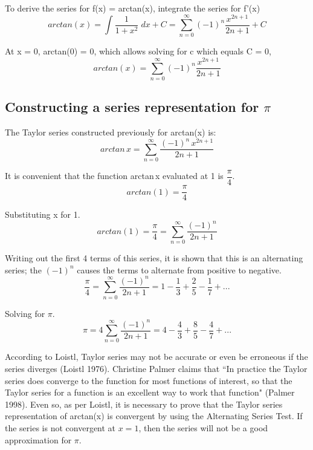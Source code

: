 \documentclass[12pt, titlepage]{article}
\begin{document}
To derive the series for f(x) = arctan(x), integrate the series for f'(x)
\begin{equation*}
    arctan(x) = \int \frac{1}{1+x^{2}} \; dx + C = \sum_{n=0}^{\infty} (-1)^{n}\frac{x^{2n+1}}{2n+1} + C
\end{equation*}

At x = 0, arctan(0) = 0, which allows solving for c which equals C = 0,
\begin{equation*}
    arctan(x) = \sum_{n=0}^{\infty} (-1)^{n}\frac{x^{2n+1}}{2n+1} 
\end{equation*}

\subsection{Constructing a series representation for \(\pi\)}
The Taylor series constructed previously for arctan(x) is:
\begin{equation*}
    arctan\,x = \sum^{\infty}_{n=0} \frac{(-1)^{n}\,x^{2n+1}}{2n+1}
\end{equation*}

It is convenient that the function arctan\,x evaluated at 1 is \(\dfrac{\pi}{4}\).
\begin{equation*}
    arctan(1) = \frac{\pi}{4}
\end{equation*}

Substituting x for 1.
\begin{equation*}
    arctan(1) = \frac{\pi}{4} = \sum_{n=0}^\infty{ \frac{(-1)^n}{2n+1}}
\end{equation*}

Writing out the first 4 terms of this series, it is shown that this is an alternating series; the \((-1)^{n}\) causes the terms to alternate from positive to negative.
\begin{equation*}
    \frac{\pi}{4} =\sum_{n=0}^\infty{ \frac{(-1)^n}{2n+1} = 1 - \frac{1}{3} + \frac{2}{5} - \frac{1}{7} + ... }
\end{equation*}

Solving for \(\pi\).
\begin{equation*}
    \pi = 4 \sum_{n=0}^\infty{ \frac{(-1)^n}{2n+1} = 4 - \frac{4}{3} + \frac{8}{5} - \frac{4}{7} + ... }
\end{equation*}

According to Loistl, Taylor series may not be accurate or even be erroneous if the series diverges (Loistl 1976). Christine Palmer claims that ``In practice the Taylor series does converge to the function for most functions of interest, so that the Taylor series for a function is an excellent way to work that function" (Palmer 1998). Even so, as per Loistl, it is necessary to prove that the Taylor series representation of arctan(x) is convergent by using the Alternating Series Test. If the series is not convergent at \(x = 1\), then the series will not be a good approximation for \(\pi\).
\end{document}
